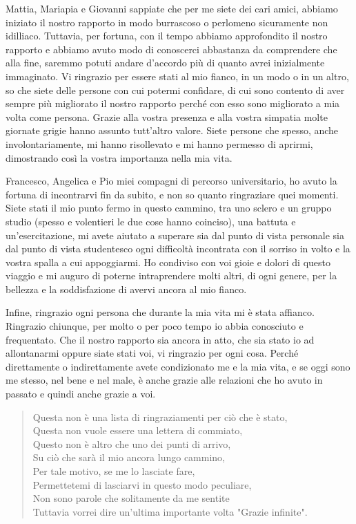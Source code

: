 Mattia, Mariapia e Giovanni sappiate che per me siete dei cari amici, abbiamo iniziato il nostro rapporto in modo burrascoso o perlomeno sicuramente non idilliaco. Tuttavia, per fortuna, con il tempo abbiamo approfondito il nostro rapporto e abbiamo avuto modo di conoscerci abbastanza da comprendere che alla fine, saremmo potuti andare d'accordo più di quanto avrei inizialmente immaginato. Vi ringrazio per essere stati al mio fianco, in un modo o in un altro, so che siete delle persone con cui potermi confidare, di cui sono contento di aver sempre più migliorato il nostro rapporto perché con esso sono migliorato a mia volta come persona. Grazie alla vostra presenza e alla vostra simpatia molte giornate grigie hanno assunto tutt'altro valore. Siete persone che spesso, anche involontariamente, mi hanno risollevato e mi hanno permesso di aprirmi, dimostrando così la vostra importanza nella mia vita.

Francesco, Angelica e Pio miei compagni di percorso universitario, ho avuto la fortuna di incontrarvi fin da subito, e non so quanto ringraziare quei momenti. Siete stati il mio punto fermo in questo cammino, tra uno sclero e un gruppo studio (spesso e volentieri le due cose hanno coinciso), una battuta e un'esercitazione, mi avete aiutato a superare sia dal punto di vista personale sia dal punto di vista studentesco ogni difficoltà incontrata con il sorriso in volto e la vostra spalla a cui appoggiarmi. Ho condiviso con voi gioie e dolori di questo viaggio e mi auguro di poterne intraprendere molti altri, di ogni genere, per la bellezza e la soddisfazione di avervi ancora al mio fianco.

Infine, ringrazio ogni persona che durante la mia vita mi è stata affianco. Ringrazio chiunque, per molto o per poco tempo io abbia conosciuto e frequentato. Che il nostro rapporto sia ancora in atto, che sia stato io ad allontanarmi oppure siate stati voi, vi ringrazio per ogni cosa. Perché direttamente o indirettamente avete condizionato me e la mia vita, e se oggi sono me stesso, nel bene e nel male, è anche grazie alle relazioni che ho avuto in passato e quindi anche grazie a voi.

\begin{verse}
Questa non è una lista di ringraziamenti per ciò che è stato,\\
Questa non vuole essere una lettera di commiato,\\
Questo non è altro che uno dei punti di arrivo,\\
Su ciò che sarà il mio ancora lungo cammino,\\
Per tale motivo, se me lo lasciate fare,\\
Permettetemi di lasciarvi in questo modo peculiare,\\
Non sono parole che solitamente da me sentite\\
Tuttavia vorrei dire un'ultima importante volta "Grazie infinite".
\end{verse}